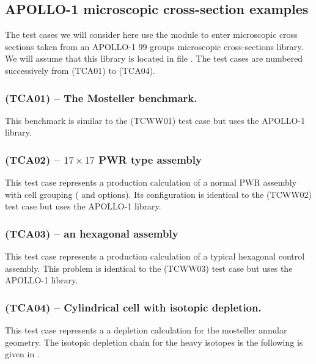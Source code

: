 \subsection{APOLLO-1 microscopic cross-section examples}\label{sect:ExAPOLLO}

The test cases we will consider here use the  module to enter
microscopic cross sections taken from an APOLLO-1 99 groups microscopic
cross-sections library. We will assume that this library is located in file
. The test cases are numbered successively from
\tst(TCA01) to \tst(TCA04).

\subsubsection{\tst(TCA01) -- The Mosteller benchmark.} 

  This benchmark is similar to the \tst(TCWW01) test case but uses the APOLLO-1 library. 


\subsubsection{\tst(TCA02) -- $17\times 17$ PWR type assembly}

This test case represents a production calculation of a normal PWR assembly with
cell grouping ( and  options). Its configuration is
identical to the \tst(TCWW02) test case but uses the APOLLO-1 library.


\subsubsection{\tst(TCA03) -- an hexagonal assembly}

This test case represents a production calculation of a typical hexagonal
control assembly.  This problem is identical to the \tst(TCWW03) test case but
uses the APOLLO-1 library.


\subsubsection{\tst(TCA04) -- Cylindrical cell with isotopic depletion.}

This test case represents a a depletion calculation for the mosteller annular geometry.
The isotopic depletion chain for the heavy isotopes is the following is given
in .


\eject
